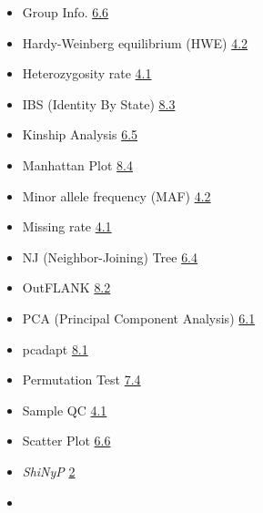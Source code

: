 \documentclass[
]{book}
\begin{document}
\begin{itemize}
\item
  Group Info. \href{https://teddyenn.github.io/ShiNyP_guide.io/sec-population-structure.html\#scatter-plot-plus}{6.6}
\item
  Hardy-Weinberg equilibrium (HWE) \href{https://teddyenn.github.io/ShiNyP_guide.io/sec-data-qc.html\#snp-qc}{4.2}
\item
  Heterozygosity rate \href{https://teddyenn.github.io/ShiNyP_guide.io/sec-data-qc.html\#sample-qc}{4.1}
\item
  IBS (Identity By State) \href{https://teddyenn.github.io/ShiNyP_guide.io/sec-selection-sweep.html\#ibs-identity-by-state}{8.3}
\item
  Kinship Analysis \href{https://teddyenn.github.io/ShiNyP_guide.io/sec-population-structure.html\#kinship-analysis}{6.5}
\item
  Manhattan Plot \href{https://teddyenn.github.io/ShiNyP_guide.io/sec-selection-sweep.html\#manhattan-plot-plus}{8.4}
\item
  Minor allele frequency (MAF) \href{https://teddyenn.github.io/ShiNyP_guide.io/sec-data-qc.html\#snp-qc}{4.2}
\item
  Missing rate \href{https://teddyenn.github.io/ShiNyP_guide.io/sec-data-qc.html\#sample-qc}{4.1}
\item
  NJ (Neighbor-Joining) Tree \href{https://teddyenn.github.io/ShiNyP_guide.io/sec-population-structure.html\#nj-neighbor-joining-tree}{6.4}
\item
  OutFLANK \href{https://teddyenn.github.io/ShiNyP_guide.io/sec-selection-sweep.html\#outflank}{8.2}
\item
  PCA (Principal Component Analysis) \href{https://teddyenn.github.io/ShiNyP_guide.io/sec-population-structure.html\#pca-principal-component-analysis}{6.1}
\item
  pcadapt \href{https://teddyenn.github.io/ShiNyP_guide.io/sec-selection-sweep.html\#pcadapt}{8.1}
\item
  Permutation Test \href{https://teddyenn.github.io/ShiNyP_guide.io/sec-genetic-diversity.html\#step-2-run-permutation-test}{7.4}
\item
  Sample QC \href{https://teddyenn.github.io/ShiNyP_guide.io/sec-data-qc.html\#sample-qc}{4.1}
\item
  Scatter Plot \href{https://teddyenn.github.io/ShiNyP_guide.io/sec-data-qc.html\#sample-qc}{6.6}
\item
  \emph{ShiNyP} \href{https://teddyenn.github.io/ShiNyP_guide.io/sec-shinyp.html\#sec-shinyp}{2}
\item

\end{itemize}
\end{document}
